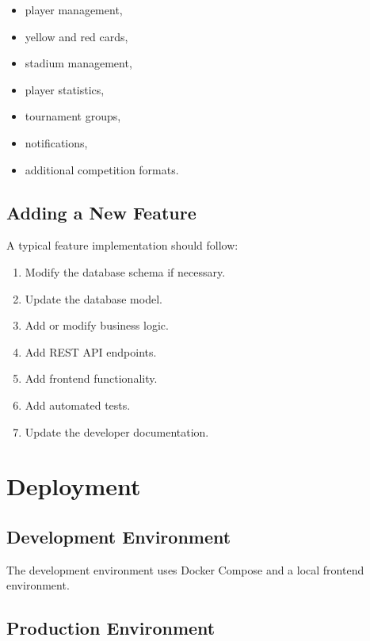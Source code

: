 \documentclass[12pt,a4paper]{article}
\begin{document}
\begin{itemize}
    \item player management,
    \item yellow and red cards,
    \item stadium management,
    \item player statistics,
    \item tournament groups,
    \item notifications,
    \item additional competition formats.
\end{itemize}

\subsection{Adding a New Feature}

A typical feature implementation should follow:

\begin{enumerate}
    \item Modify the database schema if necessary.
    \item Update the database model.
    \item Add or modify business logic.
    \item Add REST API endpoints.
    \item Add frontend functionality.
    \item Add automated tests.
    \item Update the developer documentation.
\end{enumerate}


\section{Deployment}

\subsection{Development Environment}

The development environment uses Docker Compose and a local
frontend environment.

\subsection{Production Environment}
\end{document}
